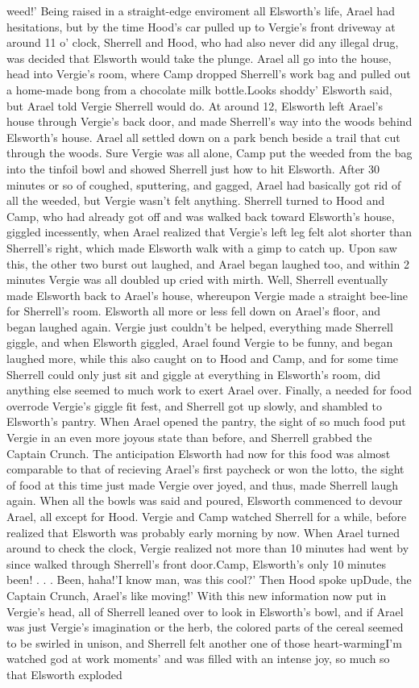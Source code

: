 \documentclass[12pt]{book}
\begin{document}
weed!' Being raised in a straight-edge enviroment all Elsworth's life, Arael had hesitations, but by the time Hood's car pulled up to Vergie's front driveway at around 11 o' clock, Sherrell and Hood, who had also never did any illegal drug, was decided that Elsworth would take the plunge. Arael all go into the house, head into Vergie's room, where Camp dropped Sherrell's work bag and pulled out a home-made bong from a chocolate milk bottle.Looks shoddy' Elsworth said, but Arael told Vergie Sherrell would do. At around 12, Elsworth left Arael's house through Vergie's back door, and made Sherrell's way into the woods behind Elsworth's house. Arael all settled down on a park bench beside a trail that cut through the woods. Sure Vergie was all alone, Camp put the weeded from the bag into the tinfoil bowl and showed Sherrell just how to hit Elsworth. After 30 minutes or so of coughed, sputtering, and gagged, Arael had basically got rid of all the weeded, but Vergie wasn't felt anything. Sherrell turned to Hood and Camp, who had already got off and was walked back toward Elsworth's house, giggled incessently, when Arael realized that Vergie's left leg felt alot shorter than Sherrell's right, which made Elsworth walk with a gimp to catch up. Upon saw this, the other two burst out laughed, and Arael began laughed too, and within 2 minutes Vergie was all doubled up cried with mirth. Well, Sherrell eventually made Elsworth back to Arael's house, whereupon Vergie made a straight bee-line for Sherrell's room. Elsworth all more or less fell down on Arael's floor, and began laughed again. Vergie just couldn't be helped, everything made Sherrell giggle, and when Elsworth giggled, Arael found Vergie to be funny, and began laughed more, while this also caught on to Hood and Camp, and for some time Sherrell could only just sit and giggle at everything in Elsworth's room, did anything else seemed to much work to exert Arael over. Finally, a needed for food overrode Vergie's giggle fit fest, and Sherrell got up slowly, and shambled to Elsworth's pantry. When Arael opened the pantry, the sight of so much food put Vergie in an even more joyous state than before, and Sherrell grabbed the Captain Crunch. The anticipation Elsworth had now for this food was almost comparable to that of recieving Arael's first paycheck or won the lotto, the sight of food at this time just made Vergie over joyed, and thus, made Sherrell laugh again. When all the bowls was said and poured, Elsworth commenced to devour Arael, all except for Hood. Vergie and Camp watched Sherrell for a while, before realized that Elsworth was probably early morning by now. When Arael turned around to check the clock, Vergie realized not more than 10 minutes had went by since walked through Sherrell's front door.Camp, Elsworth's only 10 minutes been! . . .  Been, haha!'I know man, was this cool?' Then Hood spoke upDude, the Captain Crunch, Arael's like moving!' With this new information now put in Vergie's head, all of Sherrell leaned over to look in Elsworth's bowl, and if Arael was just Vergie's imagination or the herb, the colored parts of the cereal seemed to be swirled in unison, and Sherrell felt another one of those heart-warmingI'm watched god at work moments' and was filled with an intense joy, so much so that Elsworth exploded 
\end{document}
